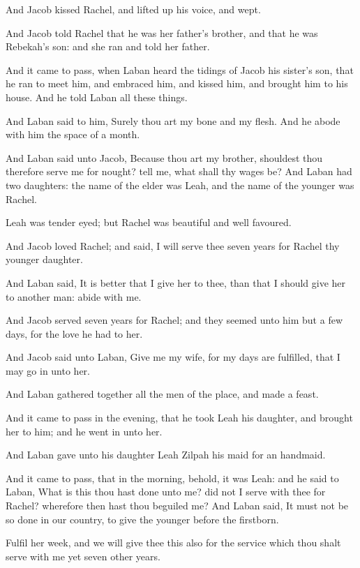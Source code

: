 \verse And Jacob kissed Rachel, and lifted up his voice, and wept.

\verse And Jacob told Rachel that he was her father's brother, and that
he was Rebekah's son: and she ran and told her father.

\verse And it came to pass, when Laban heard the tidings of Jacob his
sister's son, that he ran to meet him, and embraced him, and kissed
him, and brought him to his house. And he told Laban all these things.

\verse And Laban said to him, Surely thou art my bone and my flesh. And
he abode with him the space of a month.

\verse And Laban said unto Jacob, Because thou art my brother,
shouldest thou therefore serve me for nought? tell me, what shall thy
wages be?  \verse And Laban had two daughters: the name of the elder
was Leah, and the name of the younger was Rachel.

\verse Leah was tender eyed; but Rachel was beautiful and well
favoured.

\verse And Jacob loved Rachel; and said, I will serve thee seven years
for Rachel thy younger daughter.

\verse And Laban said, It is better that I give her to thee, than that
I should give her to another man: abide with me.

\verse And Jacob served seven years for Rachel; and they seemed unto
him but a few days, for the love he had to her.

\verse And Jacob said unto Laban, Give me my wife, for my days are
fulfilled, that I may go in unto her.

\verse And Laban gathered together all the men of the place, and made a
feast.

\verse And it came to pass in the evening, that he took Leah his
daughter, and brought her to him; and he went in unto her.

\verse And Laban gave unto his daughter Leah Zilpah his maid for an
handmaid.

\verse And it came to pass, that in the morning, behold, it was Leah:
and he said to Laban, What is this thou hast done unto me? did not I
serve with thee for Rachel? wherefore then hast thou beguiled me?
\verse And Laban said, It must not be so done in our country, to give
the younger before the firstborn.

\verse Fulfil her week, and we will give thee this also for the service
which thou shalt serve with me yet seven other years.

